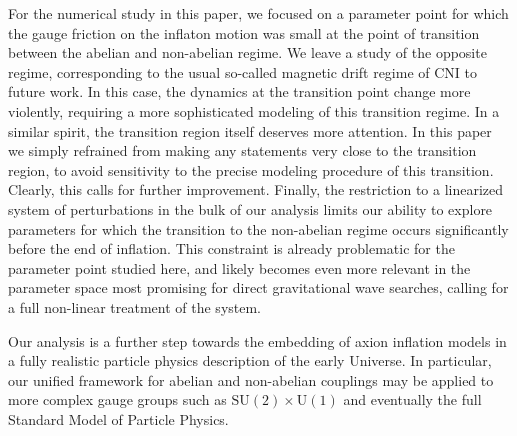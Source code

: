 For the numerical study in this paper, we focused on a parameter point for which the gauge friction on the inflaton motion was small at the point of transition between the abelian and non-abelian regime. We leave a study of the opposite regime, corresponding to the usual so-called magnetic drift regime of CNI to future work. In this case, the dynamics at the transition point change more violently, requiring a more sophisticated modeling of this transition regime. In a similar spirit, the transition region itself deserves more attention. In this paper we simply refrained from making any statements very close to the transition region, to avoid sensitivity to the precise modeling procedure of this transition. Clearly, this calls for further improvement. Finally, the restriction to a linearized system of perturbations in the bulk of our analysis limits our ability to explore parameters for which the transition to the non-abelian regime occurs significantly before the end of inflation. This constraint is already problematic for the parameter point studied here, and likely becomes even more relevant in the parameter space most promising for direct gravitational wave searches, calling for a full non-linear treatment of the system. 

Our analysis is a further step towards the embedding of axion inflation models in a fully realistic particle physics description of the early Universe. In particular, our unified framework for abelian and non-abelian couplings may be applied to more complex gauge groups such as $\mathrm{SU}(2) \times \mathrm{U}(1)$ and eventually the full Standard Model of Particle Physics.





